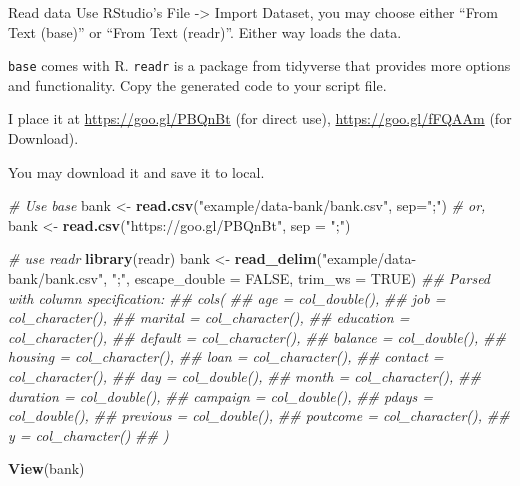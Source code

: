 \documentclass[
  10pt,
  ignorenonframetext,
  serif]{beamer}
\newenvironment{Shaded}{\begin{snugshade}}{\end{snugshade}}
\newcommand{\CommentTok}[1]{\textcolor[rgb]{0.56,0.35,0.01}{\textit{#1}}}
\newcommand{\DataTypeTok}[1]{\textcolor[rgb]{0.13,0.29,0.53}{#1}}
\newcommand{\KeywordTok}[1]{\textcolor[rgb]{0.13,0.29,0.53}{\textbf{#1}}}
\newcommand{\NormalTok}[1]{#1}
\newcommand{\OtherTok}[1]{\textcolor[rgb]{0.56,0.35,0.01}{#1}}
\newcommand{\StringTok}[1]{\textcolor[rgb]{0.31,0.60,0.02}{#1}}
\begin{document}
\begin{frame}[fragile]{Read data}
\protect\hypertarget{read-data}{}
Use RStudio's File -\textgreater{} Import Dataset, you may choose either
``From Text (base)'' or ``From Text (readr)''. Either way loads the
data.

\texttt{base} comes with R. \texttt{readr} is a package from tidyverse
that provides more options and functionality. Copy the generated code to
your script file.

I place it at \url{https://goo.gl/PBQnBt} (for direct use),
\url{https://goo.gl/fFQAAm} (for Download).

You may download it and save it to local.

\begin{Shaded}
\begin{Highlighting}[]
\CommentTok{\# Use base}
\NormalTok{bank \textless{}{-}}\StringTok{ }\KeywordTok{read.csv}\NormalTok{(}\StringTok{"example/data{-}bank/bank.csv"}\NormalTok{, }\DataTypeTok{sep=}\StringTok{";"}\NormalTok{) }\CommentTok{\# or,}
\NormalTok{bank \textless{}{-}}\StringTok{ }\KeywordTok{read.csv}\NormalTok{(}\StringTok{"https://goo.gl/PBQnBt"}\NormalTok{, }\DataTypeTok{sep =} \StringTok{";"}\NormalTok{)}

\CommentTok{\# use readr}
\KeywordTok{library}\NormalTok{(readr)}
\NormalTok{bank \textless{}{-}}\StringTok{ }\KeywordTok{read\_delim}\NormalTok{(}\StringTok{"example/data{-}bank/bank.csv"}\NormalTok{, }
                    \StringTok{";"}\NormalTok{, }\DataTypeTok{escape\_double =} \OtherTok{FALSE}\NormalTok{, }\DataTypeTok{trim\_ws =} \OtherTok{TRUE}\NormalTok{)}
\CommentTok{\#\# Parsed with column specification:}
\CommentTok{\#\# cols(}
\CommentTok{\#\#   age = col\_double(),}
\CommentTok{\#\#   job = col\_character(),}
\CommentTok{\#\#   marital = col\_character(),}
\CommentTok{\#\#   education = col\_character(),}
\CommentTok{\#\#   default = col\_character(),}
\CommentTok{\#\#   balance = col\_double(),}
\CommentTok{\#\#   housing = col\_character(),}
\CommentTok{\#\#   loan = col\_character(),}
\CommentTok{\#\#   contact = col\_character(),}
\CommentTok{\#\#   day = col\_double(),}
\CommentTok{\#\#   month = col\_character(),}
\CommentTok{\#\#   duration = col\_double(),}
\CommentTok{\#\#   campaign = col\_double(),}
\CommentTok{\#\#   pdays = col\_double(),}
\CommentTok{\#\#   previous = col\_double(),}
\CommentTok{\#\#   poutcome = col\_character(),}
\CommentTok{\#\#   y = col\_character()}
\CommentTok{\#\# )}
\end{Highlighting}
\end{Shaded}

\begin{Shaded}
\begin{Highlighting}[]
\KeywordTok{View}\NormalTok{(bank)}
\end{Highlighting}
\end{Shaded}
\end{frame}
\end{document}
